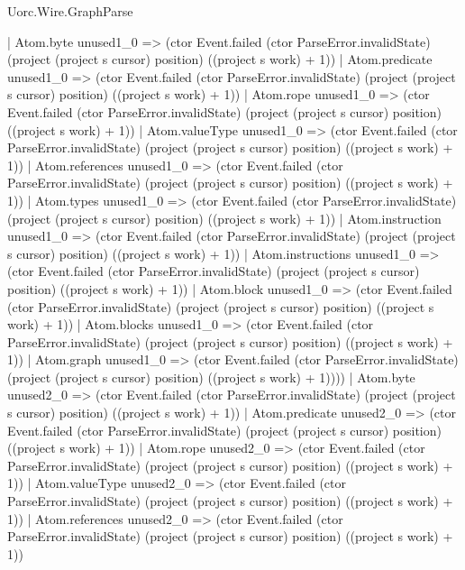 \begin{lexlean}{Uorc.Wire.GraphParse}
\begin{semanticmodule}
{                          | Atom.byte unused1_0 => (ctor Event.failed (ctor ParseError.invalidState) (project (project s cursor) position) ((project s work) + 1))
                          | Atom.predicate unused1_0 => (ctor Event.failed (ctor ParseError.invalidState) (project (project s cursor) position) ((project s work) + 1))
                          | Atom.rope unused1_0 => (ctor Event.failed (ctor ParseError.invalidState) (project (project s cursor) position) ((project s work) + 1))
                          | Atom.valueType unused1_0 => (ctor Event.failed (ctor ParseError.invalidState) (project (project s cursor) position) ((project s work) + 1))
                          | Atom.references unused1_0 => (ctor Event.failed (ctor ParseError.invalidState) (project (project s cursor) position) ((project s work) + 1))
                          | Atom.types unused1_0 => (ctor Event.failed (ctor ParseError.invalidState) (project (project s cursor) position) ((project s work) + 1))
                          | Atom.instruction unused1_0 => (ctor Event.failed (ctor ParseError.invalidState) (project (project s cursor) position) ((project s work) + 1))
                          | Atom.instructions unused1_0 => (ctor Event.failed (ctor ParseError.invalidState) (project (project s cursor) position) ((project s work) + 1))
                          | Atom.block unused1_0 => (ctor Event.failed (ctor ParseError.invalidState) (project (project s cursor) position) ((project s work) + 1))
                          | Atom.blocks unused1_0 => (ctor Event.failed (ctor ParseError.invalidState) (project (project s cursor) position) ((project s work) + 1))
                          | Atom.graph unused1_0 => (ctor Event.failed (ctor ParseError.invalidState) (project (project s cursor) position) ((project s work) + 1))))
                      | Atom.byte unused2_0 => (ctor Event.failed (ctor ParseError.invalidState) (project (project s cursor) position) ((project s work) + 1))
                      | Atom.predicate unused2_0 => (ctor Event.failed (ctor ParseError.invalidState) (project (project s cursor) position) ((project s work) + 1))
                      | Atom.rope unused2_0 => (ctor Event.failed (ctor ParseError.invalidState) (project (project s cursor) position) ((project s work) + 1))
                      | Atom.valueType unused2_0 => (ctor Event.failed (ctor ParseError.invalidState) (project (project s cursor) position) ((project s work) + 1))
                      | Atom.references unused2_0 => (ctor Event.failed (ctor ParseError.invalidState) (project (project s cursor) position) ((project s work) + 1))
}
\end{semanticmodule}
\end{lexlean}
